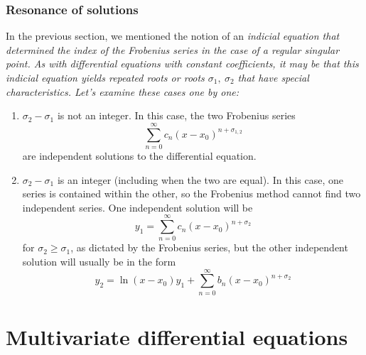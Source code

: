 \documentclass{article}
\begin{document}
\subsubsection{Resonance of solutions}
In the previous section, we mentioned the notion of an \it indicial equation \normalfont that determined the index of the Frobenius series in the case of a regular singular point. As with differential equations with constant coefficients, it may be that this indicial equation yields repeated roots or roots $\sigma_1,\ \sigma_2$ that have special characteristics. Let's examine these cases one by one:
\begin{enumerate}
    \item $\sigma_2-\sigma_1$ is not an integer. In this case, the two Frobenius series
    \begin{equation*}
        \sum_{n=0}^{\infty}c_n(x-x_0)^{n+\sigma_{1,2}}
    \end{equation*}
    are independent solutions to the differential equation. 
    \item $\sigma_2-\sigma_1$ is an integer (including when the two are equal). In this case, one series is contained within the other, so the Frobenius method cannot find two independent series. One independent solution will be 
    \begin{equation*}
        y_1=\sum_{n=0}^{\infty}c_n(x-x_0)^{n+\sigma_2}
    \end{equation*}
    for $\sigma_2\geq \sigma_1$, as dictated by the Frobenius series, but the other independent solution will usually be in the form
    \begin{equation*}
        y_2=\ln(x-x_0)y_1+\sum_{n=0}^{\infty}b_n(x-x_0)^{n+\sigma_2}
    \end{equation*}
\end{enumerate}
\newpage
\section{Multivariate differential equations}
\end{document}
